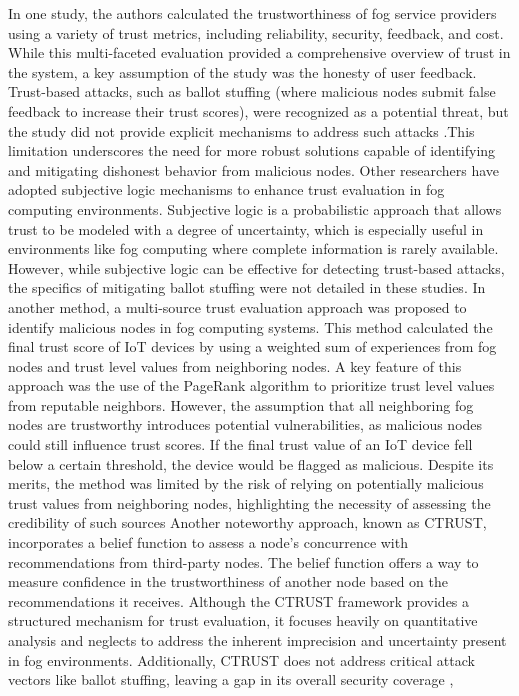 \documentclass{sn-jnl}%
\begin{document}
In one study, the authors calculated the trustworthiness of fog service providers using a variety of trust metrics, including reliability, security, feedback, and cost. While this multi-faceted evaluation provided a comprehensive overview of trust in the system, a key assumption of the study was the honesty of user feedback. Trust-based attacks, such as ballot stuffing (where malicious nodes submit false feedback to increase their trust scores), were recognized as a potential threat, but the study did not provide explicit mechanisms to address such attacks \cite{rahman2020find}.This limitation underscores the need for more robust solutions capable of identifying and mitigating dishonest behavior from malicious nodes.
Other researchers have adopted subjective logic mechanisms to enhance trust evaluation in fog computing environments. Subjective logic is a probabilistic approach that allows trust to be modeled with a degree of uncertainty, which is especially useful in environments like fog computing where complete information is rarely available. However, while subjective logic can be effective for detecting trust-based attacks, the specifics of mitigating ballot stuffing were not detailed in these studies\cite{al2021subjective}.
In another method, a multi-source trust evaluation approach was proposed to identify malicious nodes in fog computing systems. This method calculated the final trust score of IoT devices by using a weighted sum of experiences from fog nodes and trust level values from neighboring nodes. A key feature of this approach was the use of the PageRank algorithm to prioritize trust level values from reputable neighbors. However, the assumption that all neighboring fog nodes are trustworthy introduces potential vulnerabilities, as malicious nodes could still influence trust scores. If the final trust value of an IoT device fell below a certain threshold, the device would be flagged as malicious. Despite its merits, the method was limited by the risk of relying on potentially malicious trust values from neighboring nodes, highlighting the necessity of assessing the credibility of such sources \cite{hussain2018trfiot,hussain2020context}
Another noteworthy approach, known as CTRUST, incorporates a belief function to assess a node's concurrence with recommendations from third-party nodes. The belief function offers a way to measure confidence in the trustworthiness of another node based on the recommendations it receives. Although the CTRUST framework provides a structured mechanism for trust evaluation, it focuses heavily on quantitative analysis and neglects to address the inherent imprecision and uncertainty present in fog environments. Additionally, CTRUST does not address critical attack vectors like ballot stuffing, leaving a gap in its overall security coverage \cite{adewuyi2019ctrust},
\end{document}
